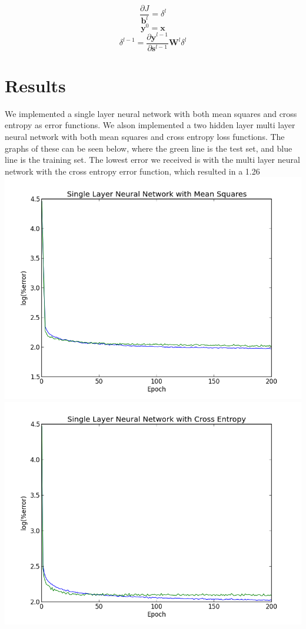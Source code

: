 \documentclass{article}
\begin{document}
$$\dfrac{\partial{J}}{\mathbf{b}^{l}} = \delta ^{l}$$
$$\mathbf{y}^{0} =\mathbf{x}$$
$$\delta ^{l-1} = \dfrac{\partial{\mathbf{y}^{l-1}}}{\partial{\mathbf{s}^{l-1}}}\mathbf{W}^{l}\delta ^{l}$$

\section*{Results}
We implemented a single layer neural network with both mean squares and cross entropy as error functions. We alson implemented a two hidden layer multi layer neural network with both mean squares and cross entropy loss functions. The graphs of these can be seen below, where the green line is the test set, and blue line is the training set. The lowest error we received is with the multi layer neural network with the cross entropy error function, which resulted in a 1.26%
\includegraphics[width=\textwidth]{slms}
\includegraphics[width=\textwidth]{slce}
\end{document}
